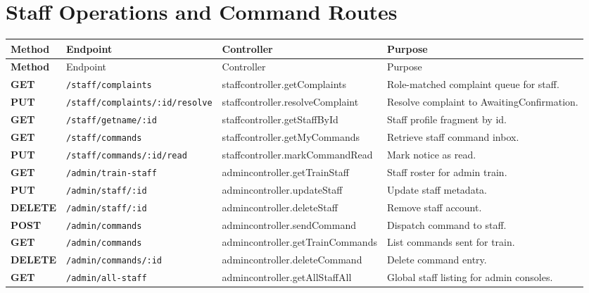 \documentclass[12pt,a4paper]{report}
\begin{document}
\section{Staff Operations and Command Routes}
\begin{longtable}{>{\bfseries}p{} p{} p{} p{}}
\toprule
\rowcolor{TableHeader}
\textcolor{TableHeaderText}{Method} & \textcolor{TableHeaderText}{Endpoint} & \textcolor{TableHeaderText}{Controller} & \textcolor{TableHeaderText}{Purpose} \\
\midrule
\endfirsthead
\toprule
\rowcolor{TableHeader}
\textcolor{TableHeaderText}{Method} & \textcolor{TableHeaderText}{Endpoint} & \textcolor{TableHeaderText}{Controller} & \textcolor{TableHeaderText}{Purpose} \\
\midrule
\endhead
GET & \texttt{/staff/complaints} & staffcontroller.getComplaints & Role-matched complaint queue for staff. \\
PUT & \texttt{/staff/complaints/:id/resolve} & staffcontroller.resolveComplaint & Resolve complaint to AwaitingConfirmation. \\
GET & \texttt{/staff/getname/:id} & staffcontroller.getStaffById & Staff profile fragment by id. \\
GET & \texttt{/staff/commands} & staffcontroller.getMyCommands & Retrieve staff command inbox. \\
PUT & \texttt{/staff/commands/:id/read} & staffcontroller.markCommandRead & Mark notice as read. \\
GET & \texttt{/admin/train-staff} & admincontroller.getTrainStaff & Staff roster for admin train. \\
PUT & \texttt{/admin/staff/:id} & admincontroller.updateStaff & Update staff metadata. \\
DELETE & \texttt{/admin/staff/:id} & admincontroller.deleteStaff & Remove staff account. \\
POST & \texttt{/admin/commands} & admincontroller.sendCommand & Dispatch command to staff. \\
GET & \texttt{/admin/commands} & admincontroller.getTrainCommands & List commands sent for train. \\
DELETE & \texttt{/admin/commands/:id} & admincontroller.deleteCommand & Delete command entry. \\
GET & \texttt{/admin/all-staff} & admincontroller.getAllStaffAll & Global staff listing for admin consoles. \\
\bottomrule
\end{longtable}
\end{document}

